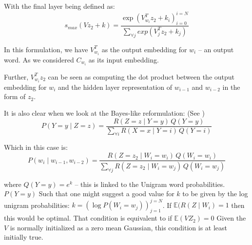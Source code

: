\documentclass[parskip]{komatufte}
\begin{document}
With the final layer being defined as:
\begin{equation}
s_{max}(Vz_{2}+k) = \dfrac{\exp\left(V_{w_{i}}^{T}z_{2}+k_{i}\right)_{i=0}^{i=N}}{\sum_{\forall j}exp\left(V_{j}^{T}z_{2}+k_{j}\right)}
\end{equation} 

In this formulation, we have $V_{w_{i}}^{T}$ as the output embedding
for $w_{i}$ -- an output word.
As we considered  $C_{w_{i}}$ as its input embedding.

Further, $V_{w_{i}}^{T}z_{2}$ can be seen as computing the dot product
between the output embedding for $w_{i}$ and the hidden layer representation
of $w_{i-1}$ and $w_{i-2}$ in the form of $z_{2}$. 

It is also clear when we look at the Bayes-like reformulation: (See )
\begin{equation}
P(Y=y\mid Z=z)=\frac{R(Z=z\mid Y=y)\,Q(Y=y)}{\sum_{\forall i}R(X=x\mid Y=i)\,Q(Y=i)}
\end{equation}

Which in this case is:
\begin{equation}
P(w_{i}\mid w_{i-1},w_{i-2})=\frac{R(Z=z_{2}\mid W_{i}=w_{i})\,Q(W_{i}=w_{i})}{\sum_{\forall j}R(Z=z_{2}\mid W_{i}=w_{j})\,Q(W_{i}=w_{j})}
\end{equation}

where $Q(Y=y)=e^{k}$ -- this is linked to the Unigram word probabilities. $P(Y=y)$
Such that one might suggest a good value for $k$ to be given by the log unigram probabilities: $k=\left(\log P(W_{i}=w_{j})\right)_{j=1}^{j=N}$.
If $\mathbb{E}(R(Z\mid W_{i})=1$ then this would be optimal.
That condition is equivalent to if $\mathbb{E}(VZ_{2})=0$
Given the $V$ is normally initialized as a zero mean Gaussian, this condition is at least initially true.
\end{document}
